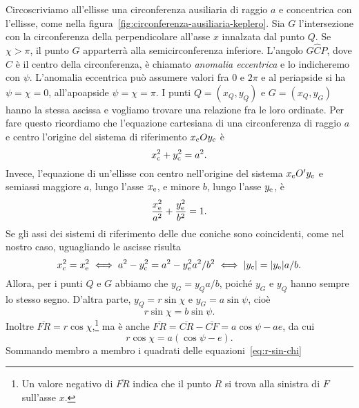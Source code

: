 Circoscriviamo all'ellisse una circonferenza ausiliaria di raggio $a$ e
concentrica con l'ellisse, come nella
figura~\ref{fig:circonferenza-ausiliaria-keplero}.  Sia $G$ l'intersezione con
la circonferenza della perpendicolare all'asse $x$ innalzata dal punto $Q$. Se
$\chi > \pi$, il punto $G$ apparterrà alla semicirconferenza inferiore. L'angolo
$G\widehat{C}P$, dove $C$ è il centro della circonferenza, è chiamato
\emph{anomalia eccentrica} e lo indicheremo con $\psi$. L'anomalia eccentrica
può assumere valori fra $0$ e $2\pi$ e al periapside si ha $\psi = \chi = 0$,
all'apoapside $\psi = \chi = \pi$. I punti $Q=(x_Q,y_Q)$ e $G=(x_Q,y_G)$ hanno
la stessa ascissa e vogliamo trovare una relazione fra le loro ordinate. Per
fare questo ricordiamo che l'equazione cartesiana di una circonferenza di raggio
$a$ e centro l'origine del sistema di riferimento $x_\textup{c}Oy_\textup{c}$ è
\begin{equation}
  x_\textup{c}^2 + y_\textup{c}^2 = a^2.
\end{equation}
Invece, l'equazione di un'ellisse con centro nell'origine del sistema
$x_\textup{e}O'y_\textup{e}$ e semiassi maggiore $a$, lungo l'asse
$x_\textup{e}$, e minore $b$, lungo l'asse $y_\textup{e}$, è
\begin{equation}
    \frac{x_\textup{e}^2}{a^2} + \frac{y_\textup{e}^2}{b^2} = 1.
\end{equation}
Se gli assi dei sistemi di riferimento delle due coniche sono coincidenti, come
nel nostro caso, uguagliando le ascisse risulta
\begin{equation}
  x_\textup{c}^2 = x_\textup{e}^2 \iff a^2 - y_\textup{c}^2 = a^2 -
  y_\textup{e}^2a^2/b^2 \iff \lvert y_\textup{c}\rvert = \lvert y_\textup{e}\rvert a/b.
\end{equation}
Allora, per i punti $Q$ e $G$ abbiamo che $y_G = y_Qa/b$, poiché $y_G$ e $y_Q$
hanno sempre lo stesso segno. D'altra parte, $y_Q = r\sin\chi$ e
$y_G = a\sin\psi$, cioè
\begin{equation}
  \label{eq:r-sin-chi}
  r\sin\chi = b\sin\psi.
\end{equation}
Inoltre $\overline{FR} =
r\cos\chi$,\footnote{Un
  valore negativo di $\overline{FR}$ indica che il punto $R$ si trova alla
  sinistra di $F$ sull'asse $x$.} ma è anche $\overline{FR} = \overline{CR} -
\overline{CF} = a\cos\psi - ae$, da cui
\begin{equation}
  \label{eq:r-cos-chi}
  r\cos\chi = a(\cos\psi - e).
\end{equation}
Sommando membro a membro i quadrati delle equazioni~\eqref{eq:r-sin-chi}

